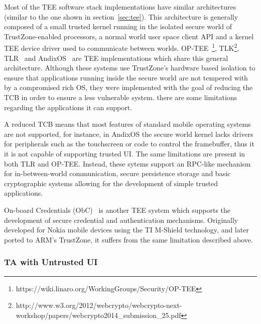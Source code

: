 Most of the \ac{TEE} software stack implementations have similar architectures (similar to the one shown in section~\ref{sec:tee}). This architecture is generally composed of a small trusted kernel running in the isolated secure world of TrustZone-enabled processors, a normal world user space client API and a kernel TEE device driver used to communicate between worlds. OP-TEE~\footnote{https://wiki.linaro.org/WorkingGroups/Security/OP-TEE}, TLK\footnote{http://www.w3.org/2012/webcrypto/webcrypto-next-workshop/papers/webcrypto2014\_submission\_25.pdf}, TLR~\cite{santos2011trusted} and AndixOS~\cite{fitzekandix} are \ac{TEE} implementations which share this general architecture. Although these systems use TrustZone's hardware based isolation to ensure that applications running inside the secure world are not tempered with by a compromised rich OS, they were implemented with the goal of reducing the \ac{TCB} in order to ensure a less vulnerable system. there are some limitations regarding the applications it can support.


A reduced \ac{TCB} means that most features of standard mobile operating systems are not supported, for instance, in AndixOS the secure world kernel lacks drivers for peripherals such as the touchscreen or code to control the framebuffer, thus it it is not capable of supporting trusted UI. The same limitations are present in both TLR and OP-TEE. Instead, these sytems support an RPC-like mechanism for in-between-world communication, secure persistence storage and basic cryptographic systems allowing for the development of simple trusted applications.


On-board Credentials (ObC)~\cite{kostiainen2012board} is another \ac{TEE} system which supports the development of secure credential and authentication mechanisms. Originally developed for Nokia mobile devices using the TI M-Shield technology, and later ported to ARM's TrustZone, it suffers from the same limitation described above.


\subsubsection{TA with Untrusted UI}

